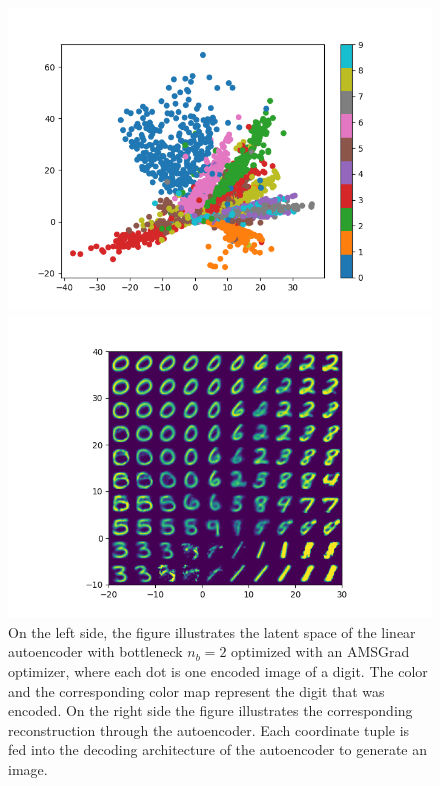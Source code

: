 \begin{figure}
\begin{center}
   \begin{minipage}[b]{0.49\linewidth}
      \includegraphics[trim = 15mm 5mm 15mm 10mm, clip, width=\linewidth]{linear_AE_2d_amsgrad_latent}
	\end{minipage}
	\begin{minipage}[b]{0.49\linewidth}
      \includegraphics[trim = 15mm 5mm 15mm 15mm, clip, width=\linewidth]{linear_AE_2d_amsgrad_reconstruction}
	\end{minipage}
\end{center}
\caption{On the left side, the figure illustrates the latent space of the linear autoencoder with bottleneck $n_b=2$ optimized with an AMSGrad optimizer, where each dot is one encoded image of a digit. The color and the corresponding color map represent the digit that was encoded. On the right side the figure illustrates the corresponding reconstruction through the autoencoder. Each coordinate tuple is fed into the decoding architecture of the autoencoder to generate an image.}\label{fig:linear_AE_2d_amsgrad_latent}
\end{figure}


